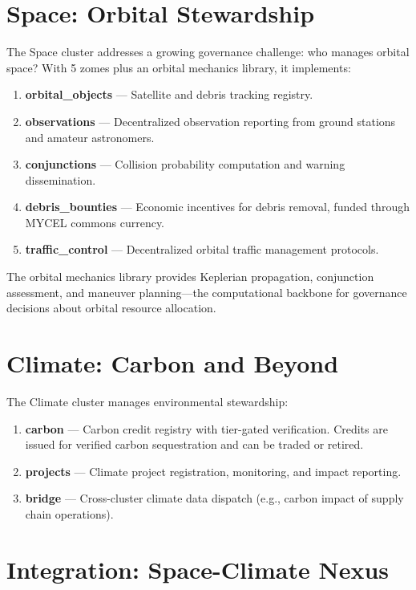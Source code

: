 \documentclass[12pt]{book}
\begin{document}
\section{Space: Orbital Stewardship}

The Space cluster addresses a growing governance challenge: who manages orbital
space? With 5 zomes plus an orbital mechanics library, it implements:

\begin{enumerate}
  \item \textbf{orbital\_objects} --- Satellite and debris tracking registry.
  \item \textbf{observations} --- Decentralized observation reporting from
    ground stations and amateur astronomers.
  \item \textbf{conjunctions} --- Collision probability computation and warning
    dissemination.
  \item \textbf{debris\_bounties} --- Economic incentives for debris removal,
    funded through MYCEL commons currency.
  \item \textbf{traffic\_control} --- Decentralized orbital traffic management
    protocols.
\end{enumerate}

The orbital mechanics library provides Keplerian propagation, conjunction
assessment, and maneuver planning---the computational backbone for governance
decisions about orbital resource allocation.

\section{Climate: Carbon and Beyond}

The Climate cluster manages environmental stewardship:

\begin{enumerate}
  \item \textbf{carbon} --- Carbon credit registry with tier-gated
    verification. Credits are issued for verified carbon sequestration and
    can be traded or retired.
  \item \textbf{projects} --- Climate project registration, monitoring, and
    impact reporting.
  \item \textbf{bridge} --- Cross-cluster climate data dispatch (e.g., carbon
    impact of supply chain operations).
\end{enumerate}

\section{Integration: Space-Climate Nexus}
\end{document}
